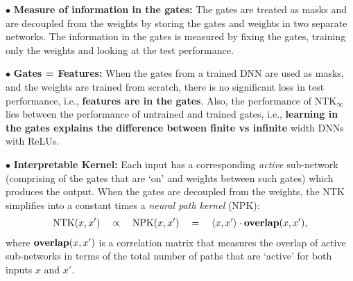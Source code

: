 $\bullet$ \textbf{Measure of information in the gates:} The gates are treated as masks and are decoupled from the weights by storing the gates and weights in two separate networks. The information in the gates is measured by fixing the gates, training only the weights and looking at the test performance.  

$\bullet$ \textbf{Gates = Features:} When the gates from a trained DNN are used as masks, and the weights are trained from scratch, there is no significant loss in test performance, i.e., \textbf{features are in the gates}. Also, the performance of $\text{NTK}_{\infty}$ lies between the performance of untrained and trained gates, i.e., \textbf{learning in the gates explains the difference between finite vs infinite} width DNNs with ReLUs.

$\bullet$ \textbf{Interpretable Kernel:} Each input has a corresponding \emph{active} sub-network (comprising of the gates that are `on' and weights between such gates) which produces the output.  When the gates are decoupled from the weights, the NTK simplifies into a constant times a \emph{neural path kernel} (NPK):
\begin{align}\label{eq:ntk-npk-relation}
\text{NTK}(x,x')\quad\propto\quad \text{NPK}(x,x')\quad =\quad \langle x,x'\rangle\cdot {\bf{overlap}}(x,x'),
\end{align}
where ${\bf{overlap}}(x,x')$ is a correlation matrix that measures the overlap of active sub-networks in terms of the  total number of paths that are `active' for both inputs $x$ and $x'$. 

\begin{comment}
\begin{center}
\emph{Duality: DNNs with ReLU are layers as well as paths}
\end{center}
The standard primal way of expressing information processing is layer by layer. In the dual view, the DNN is broken into paths. A path comprises of gates and weights, and a path is `active' or `on' only if all the gates in the path are `on'. The output is the sum of the contribution of the individual paths. 
\begin{center}
\emph{Most information (i.e., features) is in the gates and gates are learnt during training}
\end{center}
The gates are treated as masks and are decoupled from the weights by storing the gates and weights in two separate networks (see \Cref{sec:dgn}). Now, the information in the gates can be measured by fixing the gates and training the weights. It was shown that (i) when the gates from a trained DNN are used as masks, and the weights are trained from scratch, there is no significant loss in test performance, i.e., \textbf{features are stored in the gates} and (ii) gates of a trained network perform better than $\text{NTK}_{\infty}$ and gates from a untrained network performs poorly than $\text{NTK}_{\infty}$, i.e., \textbf{learning in the gates explains the difference between finite vs infinite} width DNNs with ReLUs.
\begin{center}
\emph{NTK is interpretable in terms of active sub-networks}
\end{center}
\end{comment}


